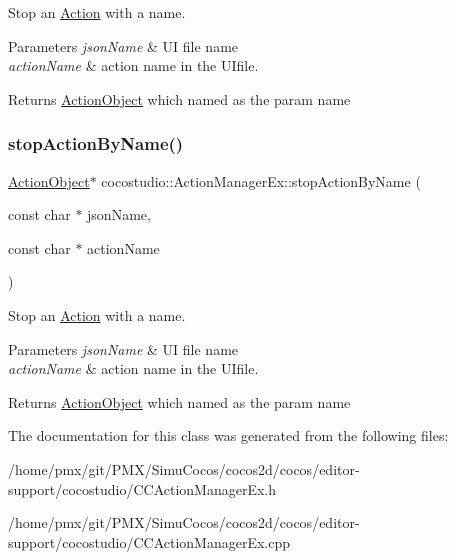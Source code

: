 Stop an \hyperlink{classAction}{Action} with a name.


\begin{DoxyParams}{Parameters}
{\em json\+Name} & UI file name\\
\hline
{\em action\+Name} & action name in the U\+Ifile.\\
\hline
\end{DoxyParams}
\begin{DoxyReturn}{Returns}
\hyperlink{classcocostudio_1_1ActionObject}{Action\+Object} which named as the param name 
\end{DoxyReturn}
\mbox{\label{classcocostudio_1_1ActionManagerEx_a4c83b7dbf2fea12e786cedc56c90c38d}} 
\subsubsection{\texorpdfstring{stop\+Action\+By\+Name()}{stopActionByName()}\hspace{0.1cm}{\footnotesize\ttfamily [2/2]}}
{\footnotesize\ttfamily \hyperlink{classcocostudio_1_1ActionObject}{Action\+Object}$\ast$ cocostudio\+::\+Action\+Manager\+Ex\+::stop\+Action\+By\+Name (\begin{DoxyParamCaption}\item[{const char $\ast$}]{json\+Name,  }\item[{const char $\ast$}]{action\+Name }\end{DoxyParamCaption})}

Stop an \hyperlink{classAction}{Action} with a name.


\begin{DoxyParams}{Parameters}
{\em json\+Name} & UI file name\\
\hline
{\em action\+Name} & action name in the U\+Ifile.\\
\hline
\end{DoxyParams}
\begin{DoxyReturn}{Returns}
\hyperlink{classcocostudio_1_1ActionObject}{Action\+Object} which named as the param name 
\end{DoxyReturn}


The documentation for this class was generated from the following files\+:\begin{DoxyCompactItemize}
\item 
/home/pmx/git/\+P\+M\+X/\+Simu\+Cocos/cocos2d/cocos/editor-\/support/cocostudio/C\+C\+Action\+Manager\+Ex.\+h\item 
/home/pmx/git/\+P\+M\+X/\+Simu\+Cocos/cocos2d/cocos/editor-\/support/cocostudio/C\+C\+Action\+Manager\+Ex.\+cpp\end{DoxyCompactItemize}
